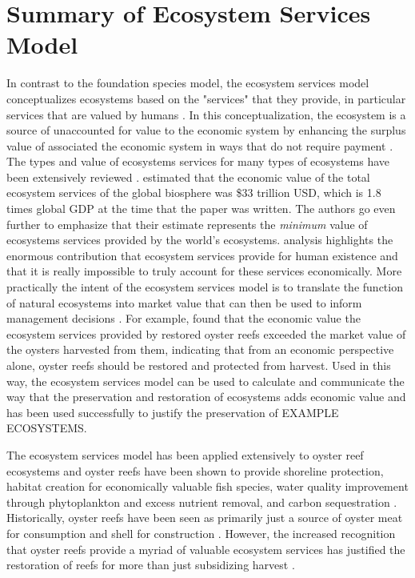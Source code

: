 \documentclass{article}
\begin{document}

\section*{Summary of Ecosystem Services Model}
\label{sec:ecosys_serv_summary}

In contrast to the foundation species model, the ecosystem services model conceptualizes ecosystems based on the "services" that they provide, in particular services that are valued by humans \cite{}. In this conceptualization, the ecosystem is a source of unaccounted for value to the economic system by enhancing the surplus value of associated the economic system in ways that do not require payment \cite{}. The types and value of ecosystems services for many types of ecosystems have been extensively reviewed \cite{costanza_value_1998}.  estimated that the economic value of the total ecosystem services of the global biosphere was \$33 trillion USD, which is 1.8 times global GDP at the time that the paper was written. The authors go even further to emphasize that their estimate represents the \emph{minimum} value of ecosystems services provided by the world's ecosystems.  analysis highlights the enormous contribution that ecosystem services provide for human existence and that it is really impossible to truly account for these services economically. 
More practically the intent of the ecosystem services model is to translate the function of natural ecosystems into market value that can then be used to inform management decisions \cite{}. For example,  found that the economic value the ecosystem services provided by restored oyster reefs exceeded the market value of the oysters harvested from them, indicating that from an economic perspective alone, oyster reefs should be restored and protected from harvest. Used in this way, the ecosystem services model can be used to calculate and communicate the way that the preservation and restoration of ecosystems adds economic value \cite{} and has been used successfully to justify the preservation of EXAMPLE ECOSYSTEMS. 

The ecosystem services model has been applied extensively to oyster reef ecosystems and oyster reefs have been shown to provide shoreline protection, habitat creation for economically valuable fish species, water quality improvement through phytoplankton and excess nutrient removal, and carbon sequestration  \cite{coen_ecosystem_2007, grabowski_economic_2012}. Historically, oyster reefs have been seen as primarily just a source of oyster meat for consumption and shell for construction \cite{}. However, the increased recognition that oyster reefs provide a myriad of valuable ecosystem services has justified the restoration of reefs for more than just subsidizing harvest \cite{}. 
\end{document}
